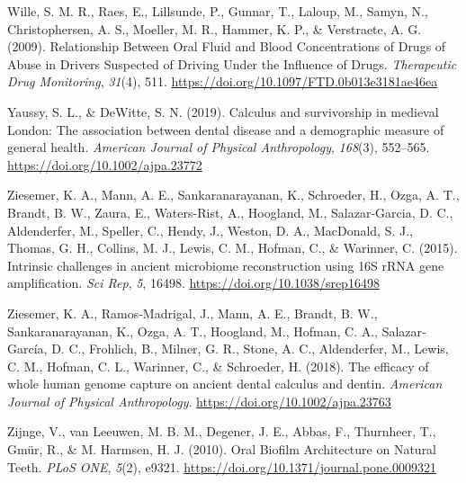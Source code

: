 \documentclass[
  letterpaper,
]{book}
\newlength{\cslhangindent}
\newlength{\cslentryspacingunit} %
\newenvironment{CSLReferences}[2] %
 {%
  \setlength{\parindent}{0pt}
  \ifodd #1
  \let\oldpar\par
  \def\par{\hangindent=\cslhangindent\oldpar}
  \fi
  \setlength{\parskip}{#2\cslentryspacingunit}
 }%
 {}
\begin{document}
\begin{CSLReferences}{1}{0}
\leavevmode{}%
Wille, S. M. R., Raes, E., Lillsunde, P., Gunnar, T., Laloup, M., Samyn,
N., Christophersen, A. S., Moeller, M. R., Hammer, K. P., \& Verstraete,
A. G. (2009). Relationship {Between Oral Fluid} and {Blood
Concentrations} of {Drugs} of {Abuse} in {Drivers Suspected} of {Driving
Under} the {Influence} of {Drugs}. \emph{Therapeutic Drug Monitoring},
\emph{31}(4), 511. \url{https://doi.org/10.1097/FTD.0b013e3181ae46ea}

\leavevmode{}%
Yaussy, S. L., \& DeWitte, S. N. (2019). Calculus and survivorship in
medieval {London}: {The} association between dental disease and a
demographic measure of general health. \emph{American Journal of
Physical Anthropology}, \emph{168}(3), 552--565.
\url{https://doi.org/10.1002/ajpa.23772}

\leavevmode{}%
Ziesemer, K. A., Mann, A. E., Sankaranarayanan, K., Schroeder, H., Ozga,
A. T., Brandt, B. W., Zaura, E., Waters-Rist, A., Hoogland, M.,
Salazar-Garcia, D. C., Aldenderfer, M., Speller, C., Hendy, J., Weston,
D. A., MacDonald, S. J., Thomas, G. H., Collins, M. J., Lewis, C. M.,
Hofman, C., \& Warinner, C. (2015). Intrinsic challenges in ancient
microbiome reconstruction using {16S rRNA} gene amplification. \emph{Sci
Rep}, \emph{5}, 16498. \url{https://doi.org/10.1038/srep16498}

\leavevmode{}%
Ziesemer, K. A., Ramos‐Madrigal, J., Mann, A. E., Brandt, B. W.,
Sankaranarayanan, K., Ozga, A. T., Hoogland, M., Hofman, C. A.,
Salazar‐García, D. C., Frohlich, B., Milner, G. R., Stone, A. C.,
Aldenderfer, M., Lewis, C. M., Hofman, C. L., Warinner, C., \&
Schroeder, H. (2018). The efficacy of whole human genome capture on
ancient dental calculus and dentin. \emph{American Journal of Physical
Anthropology}. \url{https://doi.org/10.1002/ajpa.23763}

\leavevmode{}%
Zijnge, V., van Leeuwen, M. B. M., Degener, J. E., Abbas, F., Thurnheer,
T., Gmür, R., \& M. Harmsen, H. J. (2010). Oral {Biofilm Architecture}
on {Natural Teeth}. \emph{PLoS ONE}, \emph{5}(2), e9321.
\url{https://doi.org/10.1371/journal.pone.0009321}

\end{CSLReferences}

\end{document}
